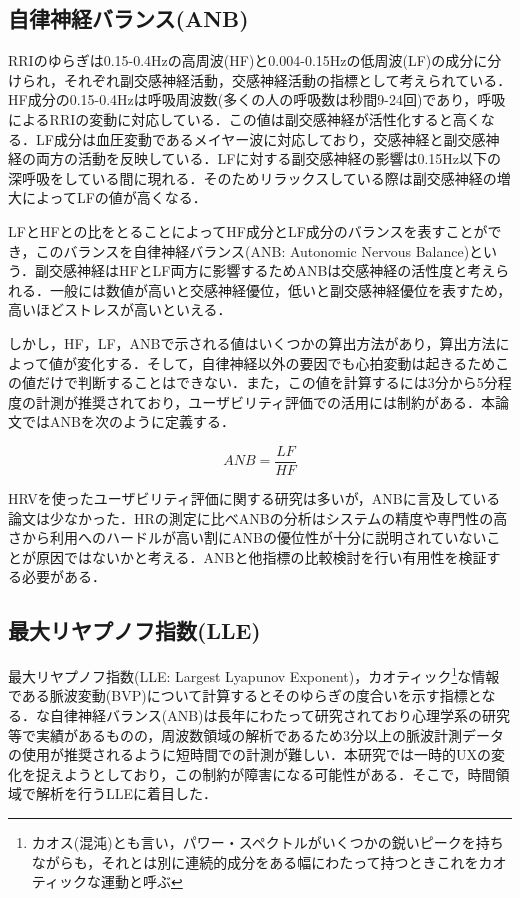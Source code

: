 \subsection{自律神経バランス(ANB)}

RRIのゆらぎは0.15-0.4Hzの高周波(HF)と0.004-0.15Hzの低周波(LF)の成分に分けられ，それぞれ副交感神経活動，交感神経活動の指標として考えられている\cite{yamaguchi}．HF成分の0.15-0.4Hzは呼吸周波数(多くの人の呼吸数は秒間9-24回)であり，呼吸によるRRIの変動に対応している．この値は副交感神経が活性化すると高くなる\cite{lehrer}．LF成分は血圧変動であるメイヤー波に対応しており，交感神経と副交感神経の両方の活動を反映している．LFに対する副交感神経の影響は0.15Hz以下の深呼吸をしている間に現れる．そのためリラックスしている際は副交感神経の増大によってLFの値が高くなる\cite{trytech}．

LFとHFとの比をとることによってHF成分とLF成分のバランスを表すことができ，このバランスを自律神経バランス(ANB: Autonomic Nervous Balance)という．副交感神経はHFとLF両方に影響するためANBは交感神経の活性度と考えられる\cite{yamaguchi}．一般には数値が高いと交感神経優位，低いと副交感神経優位を表すため，高いほどストレスが高いといえる．

しかし，HF，LF，ANBで示される値はいくつかの算出方法があり，算出方法によって値が変化する．そして，自律神経以外の要因でも心拍変動は起きるためこの値だけで判断することはできない．また，この値を計算するには3分から5分程度の計測が推奨されており\cite{nakagawa}，ユーザビリティ評価での活用には制約がある．本論文ではANBを次のように定義する．

\begin{equation}
ANB= \frac{LF}{HF} 
\end{equation}

HRVを使ったユーザビリティ評価に関する研究は多いが，ANBに言及している論文は少なかった\cite{lei2020}\cite{wollmann}．HRの測定に比べANBの分析はシステムの精度や専門性の高さから利用へのハードルが高い割にANBの優位性が十分に説明されていないことが原因ではないかと考える．ANBと他指標の比較検討を行い有用性を検証する必要がある．

\subsection{最大リヤプノフ指数(LLE)}

最大リヤプノフ指数(LLE: Largest Lyapunov Exponent)，カオティック\footnote{カオス(混沌)とも言い，パワー・スペクトルがいくつかの鋭いピークを持ちながらも，それとは別に連続的成分をある幅にわたって持つときこれをカオティックな運動と呼ぶ\cite{berje}}な情報である脈波変動(BVP)について計算するとそのゆらぎの度合いを示す指標となる\cite{oyama2012}．な自律神経バランス(ANB)は長年にわたって研究されており心理学系の研究等で実績があるものの，周波数領域の解析であるため3分以上の脈波計測データの使用が推奨されるように短時間での計測が難しい．本研究では一時的UX\cite{uxwhitepaper}の変化を捉えようとしており，この制約が障害になる可能性がある．そこで，時間領域で解析を行うLLEに着目した．

